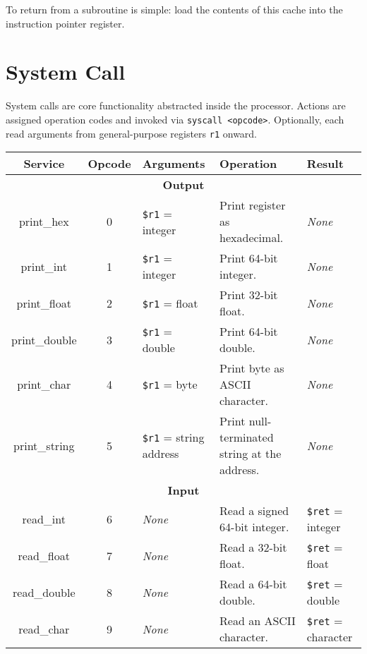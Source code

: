 \documentclass[10pt]{article}
\begin{document}
    To return from a subroutine is simple: load the contents of this cache into the instruction pointer register.

    \section{System Call}\label{sec:system-call}

    System calls are core functionality abstracted inside the processor.
    Actions are assigned operation codes and invoked via \texttt{syscall <opcode>}.
    Optionally, each read arguments from general-purpose registers \texttt{r1} onward.

    \bigskip
    \begin{longtable}{|c|c|l|l|l|}
        \hline
        \textbf{Service} & \textbf{Opcode} & \textbf{Arguments} & \textbf{Operation} & \textbf{Result} \\
        \hline
        \multicolumn{5}{|c|}{\textbf{Output}} \\
        \hline
        print\_hex & 0 & \texttt{\$r1} = integer & Print register as hexadecimal. & \textit{None} \\
        \hline
        print\_int & 1 & \texttt{\$r1} = integer & Print 64-bit integer. & \textit{None} \\
        \hline
        print\_float & 2 & \texttt{\$r1} = float & Print 32-bit float. & \textit{None} \\
        \hline
        print\_double & 3 & \texttt{\$r1} = double & Print 64-bit double. & \textit{None} \\
        \hline
        print\_char & 4 & \texttt{\$r1} = byte & Print byte as ASCII character. & \textit{None} \\
        \hline
        print\_string & 5 & \texttt{\$r1} = string address & Print null-terminated string at the address. & \textit{None} \\
        \hline \hline
        \multicolumn{5}{|c|}{\textbf{Input}} \\
        \hline
        read\_int & 6 & \textit{None} & Read a signed 64-bit integer. & \texttt{\$ret} = integer \\
        \hline
        read\_float & 7 & \textit{None} & Read a 32-bit float. & \texttt{\$ret} = float \\
        \hline
        read\_double & 8 & \textit{None} & Read a 64-bit double. & \texttt{\$ret} = double \\
        \hline
        read\_char & 9 & \textit{None} & Read an ASCII character. & \texttt{\$ret} = character \\

\end{longtable}
\end{document}
